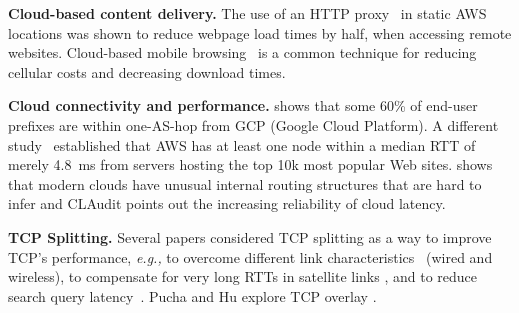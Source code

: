 \documentclass{hotnets17}
\newcommand{\mycomm}[3]{{\color{#2} \textbf{[#1: #3]}}}
\newcommand{\mycomm}[3]{}
\newcommand{\IK}[1]{\mycomm{IK}{blue}{#1}}
\providecommand{\eg}{\emph{e.g.,} }
\newcommand{\T}[1]{\smallskip\noindent\textbf{#1}} %
\begin{document}
\T{Cloud-based content delivery.} The use of an HTTP proxy~\cite{cgn2017} in static AWS locations was shown to reduce webpage load times by half, when accessing remote websites. Cloud-based mobile browsing~\cite{zhao2011reducing,wang2013accelerating} is a common technique for reducing cellular costs and decreasing download times.

\T{Cloud connectivity and performance.} \cite{one-hop} shows that some 60\% of end-user prefixes are within one-AS-hop from GCP (Google Cloud Platform). A different study~\cite{cgn2017} established that AWS has at least one node within a median RTT of merely 4.8~ms from servers hosting the top 10k most popular Web sites. \cite{unusual} shows that modern clouds have unusual internal routing structures that are hard to infer and CLAudit \cite{multidimensional} points out the increasing reliability of cloud latency. 

\T{TCP Splitting.} Several papers considered TCP splitting as a way to improve TCP's performance, \eg to overcome different link characteristics~ \cite{Kopparty2002} (wired and wireless), to compensate for very long RTTs in satellite links \cite{luglio2004}, and to reduce search query latency~\cite{pathak2010measuring}. 
Pucha and Hu explore TCP overlay \cite{pucha2005overlay, pucha2005slot}. 

\end{document}
